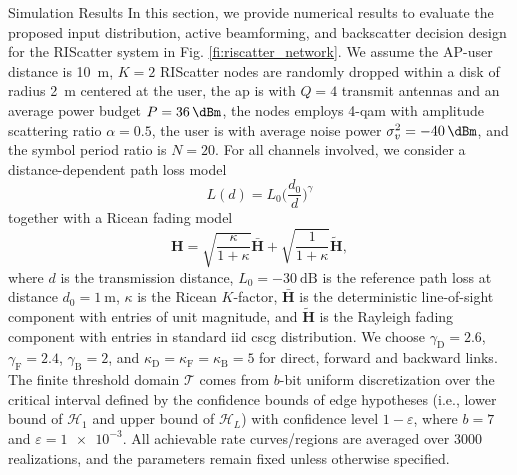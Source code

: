 \documentclass[journal]{IEEEtran}
\begin{document}
\begin{section}{Simulation Results}
	In this section, we provide numerical results to evaluate the proposed input distribution, active beamforming, and backscatter decision design for the RIScatter system in Fig. \ref{fi:riscatter_network}.
	We assume the AP-user distance is \qty{10}{\meter}, $K=2$ RIScatter nodes are randomly dropped within a disk of radius \qty{2}{\meter} centered at the user, the \gls{ap} is with $Q=4$ transmit antennas and an average power budget $P=\qty{36}{\dBm}$, the nodes employs \num{4}-\gls{qam} with amplitude scattering ratio $\alpha=0.5$, the user is with average noise power $\sigma_v^2=\qty{-40}{\dBm}$, and the symbol period ratio is $N=20$.
	For all channels involved, we consider a distance-dependent path loss model
	\begin{equation}
		L(d) = L_0 \biggl(\frac{d_0}{d}\biggr)^\gamma
	\end{equation}
	together with a Ricean fading model
	\begin{equation}
		\boldsymbol{H} = \sqrt{\frac{\kappa}{1+\kappa}} \bar{\boldsymbol{H}} + \sqrt{\frac{1}{1+\kappa}} \tilde{\boldsymbol{H}},
	\end{equation}
	where $d$ is the transmission distance, $L_0=-\qty{30}{\dB}$ is the reference path loss at distance $d_0=\qty{1}{\meter}$, $\kappa$ is the Ricean $K$-factor, $\bar{\boldsymbol{H}}$ is the deterministic line-of-sight component with entries of unit magnitude, and $\tilde{\boldsymbol{H}}$ is the Rayleigh fading component with entries in standard \gls{iid} \gls{cscg} distribution.
	We choose $\gamma_{\mathrm{D}}=2.6$, $\gamma_{\mathrm{F}}=2.4$, $\gamma_{\mathrm{B}}=2$, and $\kappa_{\mathrm{D}}=\kappa_{\mathrm{F}}=\kappa_{\mathrm{B}}=5$ for direct, forward and backward links.
	The finite threshold domain $\mathcal{T}$ comes from $b$-bit uniform discretization over the critical interval defined by the confidence bounds of edge hypotheses (i.e., lower bound of $\mathcal{H}_1$ and upper bound of $\mathcal{H}_L$) with confidence level $1-\varepsilon$, where $b=7$ and $\varepsilon=\num{1e-3}$.
	All achievable rate curves/regions are averaged over \num{3000} realizations, and the parameters remain fixed unless otherwise specified.


\end{section}
\end{document}
